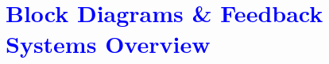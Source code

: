 \documentclass[../notes-main.tex]{subfiles}
\begin{document}
\chapter{\textcolor{blue}{Block Diagrams \& Feedback Systems Overview}}
\end{document}
